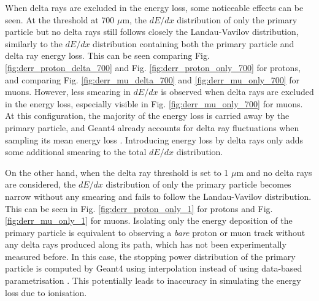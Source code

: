 When delta rays are excluded in the energy loss, some noticeable effects can be seen. 
At the threshold at 700 $\mu$m, the $dE/dx$ distribution of only the primary particle but no delta rays still follows closely the Landau-Vavilov distribution, similarly to the $dE/dx$ distribution containing both the primary particle and delta ray energy loss.
This can be seen comparing Fig. \ref{fig:derr_proton_delta_700} and Fig. \ref{fig:derr_proton_only_700} for protons, and comparing Fig. \ref{fig:derr_mu_delta_700} and \ref{fig:derr_mu_only_700} for muons. 
However, less smearing in $dE/dx$ is observed when delta rays are excluded in the energy loss, especially visible in Fig. \ref{fig:derr_mu_only_700} for muons.
At this configuration, the majority of the energy loss is carried away by the primary particle, and Geant4 already accounts for delta ray fluctuations when sampling its mean energy loss \cite{geant4}.
Introducing energy loss by delta rays only adds some additional smearing to the total $dE/dx$ distribution.

On the other hand, when the delta ray threshold is set to 1 $\mu$m and no delta rays are considered, the $dE/dx$ distribution of only the primary particle becomes narrow without any smearing and fails to follow the Landau-Vavilov distribution.
This can be seen in Fig. \ref{fig:derr_proton_only_1} for protons and Fig. \ref{fig:derr_mu_only_1} for muons. 
Isolating only the energy deposition of the primary particle is equivalent to observing a \textit{bare} proton or muon track without any delta rays produced along its path, which has not been experimentally measured before.
In this case, the stopping power distribution of the primary particle is computed by Geant4 using interpolation instead of using data-based parametrisation \cite{geant4}.
This potentially leads to inaccuracy in simulating the energy loss due to ionisation.

